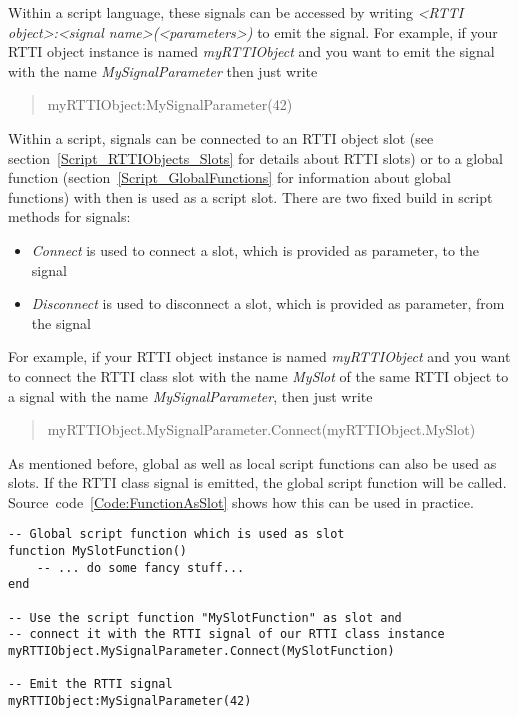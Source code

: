 Within a script language, these signals can be accessed by writing \emph{<RTTI object>:<signal name>(<parameters>)} to emit the signal. For example, if your \ac{RTTI} object instance is named \emph{myRTTIObject} and you want to emit the signal with the name \emph{MySignalParameter} then just write \begin{quote}myRTTIObject:MySignalParameter(42)\end{quote}

Within a script, signals can be connected to an \ac{RTTI} object slot (see section~\ref{Script_RTTIObjects_Slots} for details about \ac{RTTI} slots) or to a global function (section~\ref{Script_GlobalFunctions} for information about global functions) with then is used as a script slot. There are two fixed build in script methods for signals:
\begin{itemize}
\item{\emph{Connect} is used to connect a slot, which is provided as parameter, to the signal}
\item{\emph{Disconnect} is used to disconnect a slot, which is provided as parameter, from the signal}
\end{itemize}

For example, if your \ac{RTTI} object instance is named \emph{myRTTIObject} and you want to connect the \ac{RTTI} class slot with the name \emph{MySlot} of the same \ac{RTTI} object to a signal with the name \emph{MySignalParameter}, then just write \begin{quote}myRTTIObject.MySignalParameter.Connect(myRTTIObject.MySlot)\end{quote}

As mentioned before, global as well as local script functions can also be used as slots. If the \ac{RTTI} class signal is emitted, the global script function will be called. Source~code~\ref{Code:FunctionAsSlot} shows how this can be used in practice.
\begin{lstlisting}[float=htb,label=Code:FunctionAsSlot,caption={Function as slot}]
-- Global script function which is used as slot
function MySlotFunction()
	-- ... do some fancy stuff...
end

-- Use the script function "MySlotFunction" as slot and
-- connect it with the RTTI signal of our RTTI class instance
myRTTIObject.MySignalParameter.Connect(MySlotFunction)

-- Emit the RTTI signal
myRTTIObject:MySignalParameter(42)
\end{lstlisting}
